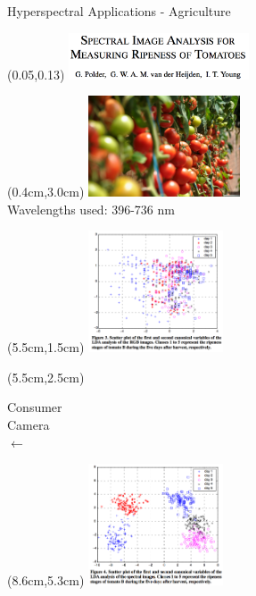 \documentclass{beamer}
\begin{document}
\begin{frame}{Hyperspectral Applications - Agriculture}
   \begin{textblock*}{\textwidth}(0.05\textwidth,0.13\textwidth) %
      \includegraphics[width=0.4\textwidth]{figures/polder1.png}
   \end{textblock*}
   \begin{textblock*}{10cm}(0.4cm,3.0cm) %
      \includegraphics[width=4.5cm]{figures/tomatoes.jpg}
      \\ Wavelengths used: 396-736 nm
   \end{textblock*}
   \begin{textblock*}{10cm}(5.5cm,1.5cm) %
      \includegraphics[width=4cm]{figures/polder2.png}
   \end{textblock*}
   \begin{textblock*}{\textwidth}(5.5cm,2.5cm) %
      \begin{center}
         {\huge Consumer \\ Camera} \\ {\Huge $\leftarrow$}
      \end{center}
   \end{textblock*}
   \begin{textblock*}{10cm}(8.6cm,5.3cm) %
      \includegraphics[width=4cm]{figures/polder3.png}

\end{textblock*}
\end{frame}
\end{document}
